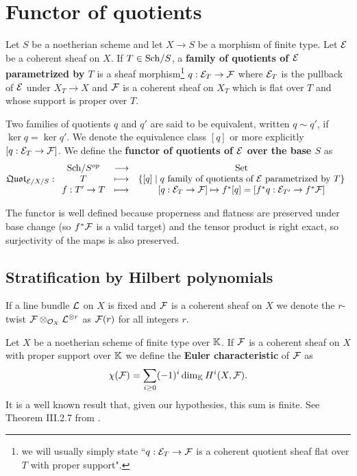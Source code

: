 \section{Functor of quotients}
\begin{definition}
Let $S$ be a noetherian scheme and let $X\to S$ be a morphism of finite type. Let $\mathcal{E}$ be a coherent sheaf on $X$. If $T\in {\mathrm{Sch}}/{S}$, a \textbf{family of quotients of $\mathcal{E}$ parametrized by $T$} is a sheaf morphism\footnote{we will usually simply state ``$q:\mathcal{E}_T\to \mathcal{F}$ is a coherent quotient sheaf flat over $T$ with proper support".} $q:\mathcal{E}_T\to \mathcal{F}$ where $\mathcal{E}_T$ is the pullback of $\mathcal{E}$ under $X_T\to X$ and $\mathcal{F}$ is a coherent sheaf on $X_T$ which is flat over $T$ and whose support is proper over $T$.

Two families of quotients $q$ and $q'$ are said to be equivalent, written $q\sim q'$, if $\ker q=\ker q'$. We denote the equivalence class $[q]$ or more explicitly $[q:\mathcal{E}_T\to \mathcal{F}]$. We define the \textbf{functor of quotients of $\mathcal{E}$ over the base $S$} as
\[\mathfrak{Quot}_{\mathcal{E}/X/S}:\begin{array}{ccc} {{\mathrm{Sch}}/{S}^{op}} & \longrightarrow & {\mathrm{Set}}\\ {T} & \longmapsto & {\left\{{[q]\mid q\text{ family of quotients of $\mathcal{E}$ parametrized by $T$}}\right\}}\\ {f:T'\to T} & \longmapsto & {[q:\mathcal{E}_T\to\mathcal{F}]\mapsto f^\ast[q]=[f^\ast q:\mathcal{E}_{T'}\to f^\ast\mathcal{F}]} \end{array}\]
\end{definition}

\begin{remark}
The functor is well defined because properness and flatness are preserved under base change (so $f^\ast \mathcal{F}$ is a valid target) and the tensor product is right exact, so surjectivity of the maps is also preserved.
\end{remark}


\subsection{Stratification by Hilbert polynomials}
\begin{notation}
If a line bundle $\mathcal{L}$ on $X$ is fixed and $\mathcal{F}$ is a coherent sheaf on $X$ we denote the $r$-twist $\mathcal{F}\otimes_{\mathcal{O}_X}\mathcal{L}^{\otimes r}$ as $\mathcal{F}(r)$ for all integers $r$.
\end{notation}
\begin{definition}
Let $X$ be a noetherian scheme of finite type over $\mathbb{K}$. If $\mathcal{F}$ is a coherent sheaf on $X$ with proper support over $\mathbb{K}$ we define the \textbf{Euler characteristic} of $\mathcal{F}$ as
\[\chi(\mathcal{F})=\sum_{i\geq 0}(-1)^i\dim_{\mathbb{K}} H^i(X,\mathcal{F}).\]
It is a well known result that, given our hypothesies, this sum is finite. See Theorem {\sc III}.2.7 from \cite{Hartshorne}.
\end{definition}

